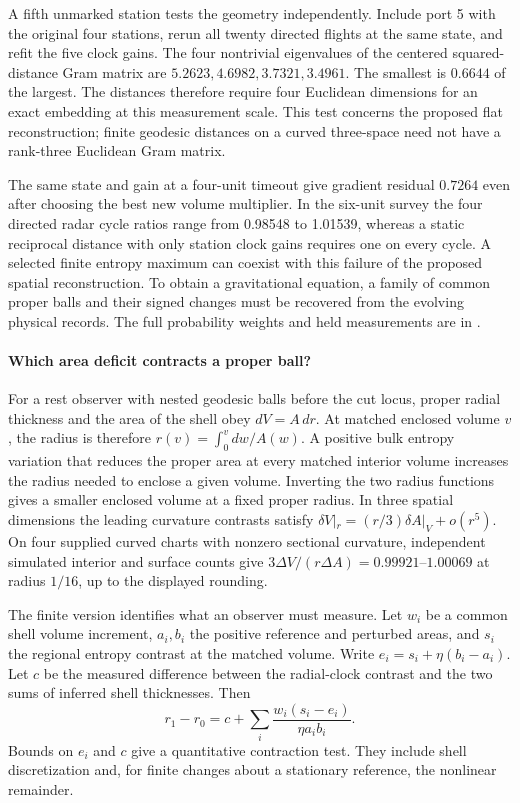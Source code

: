 \documentclass[11pt]{article}
\begin{document}
A fifth unmarked station tests the geometry independently. Include
port 5 with the original four stations, rerun all twenty directed
flights at the same state, and refit the five clock gains. The four
nontrivial eigenvalues of the centered squared-distance Gram matrix
are $5.2623,4.6982,3.7321,3.4961$. The smallest is $0.6644$ of the
largest. The distances therefore require four Euclidean dimensions
for an exact embedding at this measurement scale. This test concerns
the proposed flat reconstruction; finite geodesic distances on a
curved three-space need not have a rank-three Euclidean Gram matrix.

The same state and gain at a four-unit timeout give gradient residual
$0.7264$ even after choosing the best new volume multiplier. In the
six-unit survey the four directed radar cycle ratios range from
0.98548 to 1.01539, whereas a static reciprocal distance with only
station clock gains requires one on every cycle. A selected finite
entropy maximum can coexist with this failure of the proposed
spatial reconstruction. To obtain a gravitational equation, a family
of common proper balls and their signed changes must be recovered
from the evolving physical records. The full probability weights and
held measurements are in
.

\paragraph{Which area deficit contracts a proper ball?}
For a rest observer with nested geodesic balls before the cut locus,
proper radial thickness and the area of the shell obey \(dV=A\,dr\).
At matched enclosed volume \(v\), the radius is therefore
\(r(v)=\int_0^v dw/A(w)\). A positive bulk entropy variation that
reduces the proper area at every matched interior volume increases
the radius needed to enclose a given volume. Inverting the two
radius functions gives a smaller enclosed volume at a fixed proper
radius. In three spatial dimensions the leading curvature contrasts
satisfy \(\delta V|_r=(r/3)\delta A|_V+o(r^5)\). On four
supplied curved charts with nonzero sectional curvature, independent
simulated interior and surface counts give
\(3\Delta V/(r\Delta A)=0.99921\)--\(1.00069\) at radius \(1/16\),
up to the displayed rounding.

The finite version identifies what an observer must measure. Let
\(w_i\) be a common shell volume increment, \(a_i,b_i\) the
positive reference and perturbed areas, and \(s_i\) the regional
entropy contrast at the matched volume. Write
\(e_i=s_i+\eta(b_i-a_i)\). Let \(c\) be the measured difference
between the radial-clock contrast and the two sums of inferred shell
thicknesses. Then
\[
 r_1-r_0=c+\sum_i\frac{w_i(s_i-e_i)}{\eta a_i b_i}.
\]
Bounds on \(e_i\) and \(c\) give a quantitative contraction test.
They include shell discretization and, for finite changes about a
stationary reference, the nonlinear remainder.
\end{document}
